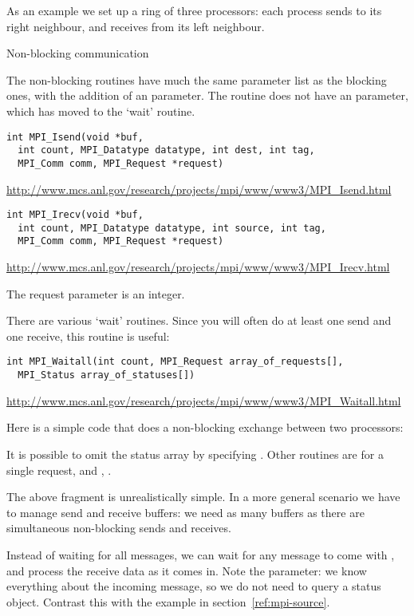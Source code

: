 As an example we set up a ring of three processors: each process sends
to its right neighbour, and receives from its left neighbour.

 {Non-blocking communication}

The non-blocking routines have much the same parameter list as the 
blocking ones, with the addition of an  parameter.
The  routine does not have an  parameter,
which has moved to the `wait' routine.
\begin{verbatim}
int MPI_Isend(void *buf,
  int count, MPI_Datatype datatype, int dest, int tag,
  MPI_Comm comm, MPI_Request *request)
\end{verbatim}
\url{http://www.mcs.anl.gov/research/projects/mpi/www/www3/MPI_Isend.html}
\begin{verbatim}
int MPI_Irecv(void *buf,
  int count, MPI_Datatype datatype, int source, int tag,
  MPI_Comm comm, MPI_Request *request)
\end{verbatim}
\url{http://www.mcs.anl.gov/research/projects/mpi/www/www3/MPI_Irecv.html}

\begin{fortrannote}
  The request parameter is an integer.
\end{fortrannote}

There are various `wait' routines. Since you will often do at least
one send and one receive, this routine is useful:
\begin{verbatim}
int MPI_Waitall(int count, MPI_Request array_of_requests[], 
  MPI_Status array_of_statuses[])
\end{verbatim}
\url{http://www.mcs.anl.gov/research/projects/mpi/www/www3/MPI_Waitall.html}

Here is a simple code that does a non-blocking exchange between two processors:

It is possible to omit the status array by specifying .
Other routines are  for a single request, and
, .

The above fragment is unrealistically simple. In a more general scenario we
have to manage send and receive buffers: we need as many buffers as there are
simultaneous non-blocking sends and receives.

Instead of waiting for all messages, we can wait for any message to come
with , and process the receive data as it comes in.
Note the  parameter: we know everything
about the incoming message, so we do not need to query a status object.
Contrast this with the example in section~\ref{ref:mpi-source}.

